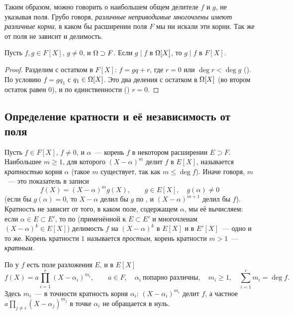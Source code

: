 Таким образом, можно говорить о наибольшем общем делителе $f$ и $g$, не указывая поля. Грубо говоря, \emph{различные
неприводимые многочлены имеют различные корни}, в каком бы расширении поля $F$ мы ни искали эти корни. Так же от поля не
зависит и делимость.

\begin{lemma}[2.17a]
Пусть $f,g\in F[X]$, $g\ne0$, и $\Omega\supset F$. Если $g\mid f$ в $\Omega[X]$, то $g\mid f$ в $F[X]$.
\end{lemma}

\begin{proof}
Разделим с остатком в $F[X]$: $f=gq+r$, где $r=0$ или $\deg r<\deg g$ (). По условию $f=gq_1$ с $q_1\in\Omega[X]$.
Это два деления с остатком в $\Omega[X]$ (во втором остаток равен $0$), и по единственности () $r=0$.
\end{proof}

\subsection*{Определение кратности и её независимость от поля}

Пусть $f\in F[X]$, $f\ne0$, и $\alpha$~--- корень $f$ в некотором расширении $E\supset F$. Наибольшее $m\ge1$, для
которого $(X-\alpha)^m$ делит $f$ в $E[X]$, называется \emph{кратностью} корня $\alpha$ (такое $m$ существует, так как
$m\le\deg f$). Иначе говоря, $m$~--- это показатель в записи
\[
f(X)=(X-\alpha)^mg(X),\qquad g\in E[X],\quad g(\alpha)\ne0
\]
(если бы $g(\alpha)=0$, то $X-\alpha$ делил бы $g$ по , и $(X-\alpha)^{m+1}$ делил бы $f$). Кратность не зависит от
того, в каком поле, содержащем $\alpha$, мы её вычисляем: если $\alpha\in E\subset E'$, то по  (применённой к
$E\subset E'$ и многочленам $(X-\alpha)^k\in E[X]$) делимость $f$ на $(X-\alpha)^k$ в $E[X]$ и в $E'[X]$~--- одно и то же.
Корень кратности $1$ называется \emph{простым}, корень кратности $m>1$~--- \emph{кратным}.

По  у $f$ есть поле разложения $E$, и в $E[X]$
\begin{equation}\label{eq:ch2B-split}
f(X)=a\prod_{i=1}^r(X-\alpha_i)^{m_i},\qquad a\in F,\quad \alpha_i\ \text{попарно различны},\quad m_i\ge1,\quad
\sum_{i=1}^rm_i=\deg f .
\end{equation}
Здесь $m_i$~--- в точности кратность корня $\alpha_i$: $(X-\alpha_i)^{m_i}$ делит $f$, а частное
$a\prod_{j\ne i}(X-\alpha_j)^{m_j}$ в точке $\alpha_i$ не обращается в нуль.

